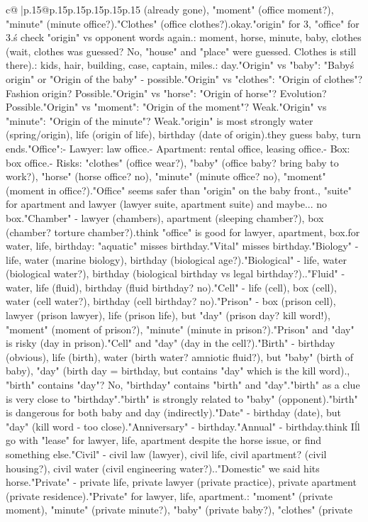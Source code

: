 \documentclass{article}
\begin{document}
{\begin{supertabular}{c@{$\;$}|p{.15\linewidth}@{}p{.15\linewidth}p{.15\linewidth}p{.15\linewidth}p{.15\linewidth}p{.15\linewidth}}
{{{(already gone), "moment" (office moment?), "minute" (minute office?).\n"Clothes" (office clothes?).\nSeems okay.\n\nSo "origin" for 3, "office" for 3.\n\nLet\'s check "origin" vs opponent words again.\nOpponent: moment, horse, minute, baby, clothes (wait, clothes was guessed? No, "house" and "place" were guessed. Clothes is still there).\nDistractor: kids, hair, building, case, captain, miles.\nKill: day.\n\n"Origin" vs "baby": "Baby\'s origin" or "Origin of the baby" - possible.\n"Origin" vs "clothes": "Origin of clothes"? Fashion origin? Possible.\n"Origin" vs "horse": "Origin of horse"? Evolution? Possible.\n"Origin" vs "moment": "Origin of the moment"? Weak.\n"Origin" vs "minute": "Origin of the minute"? Weak.\n\nBut "origin" is most strongly water (spring/origin), life (origin of life), birthday (date of origin).\n\nIf they guess baby, turn ends.\n\n"Office":\n- Lawyer: law office.\n- Apartment: rental office, leasing office.\n- Box: box office.\n- Risks: "clothes" (office wear?), "baby" (office baby? bring baby to work?), "horse" (horse office? no), "minute" (minute office? no), "moment" (moment in office?).\n\n"Office" seems safer than "origin" on the baby front.\n\nActually, "suite" for apartment and lawyer (lawyer suite, apartment suite) and maybe... no box.\n\n"Chamber" - lawyer (chambers), apartment (sleeping chamber?), box (chamber? torture chamber?).\n\nI think "office" is good for lawyer, apartment, box.\n\nAnd for water, life, birthday: "aquatic" misses birthday.\n"Vital" misses birthday.\n"Biology" - life, water (marine biology), birthday (biological age?).\n"Biological" - life, water (biological water?), birthday (biological birthday vs legal birthday?).\nWeak.\n\n"Fluid" - water, life (fluid), birthday (fluid birthday? no).\n\n"Cell" - life (cell), box (cell), water (cell water?), birthday (cell birthday? no).\n\n"Prison" - box (prison cell), lawyer (prison lawyer), life (prison life), but "day" (prison day? kill word!), "moment" (moment of prison?), "minute" (minute in prison?).\n"Prison" and "day" is risky (day in prison).\n\n"Cell" and "day" (day in the cell?).\n\n"Birth" - birthday (obvious), life (birth), water (birth water? amniotic fluid?), but "baby" (birth of baby), "day" (birth day = birthday, but contains "day" which is the kill word).\nActually, "birth" contains "day"? No, "birthday" contains "birth" and "day".\nBut "birth" as a clue is very close to "birthday".\nAnd "birth" is strongly related to "baby" (opponent).\nSo "birth" is dangerous for both baby and day (indirectly).\n\n"Date" - birthday (date), but "day" (kill word - too close).\n"Anniversary" - birthday.\n"Annual" - birthday.\n\nI think I\'ll go with "lease" for lawyer, life, apartment despite the horse issue, or find something else.\n\n"Civil" - civil law (lawyer), civil life, civil apartment? (civil housing?), civil water (civil engineering water?).\nWeak.\n\n"Domestic" we said hits horse.\n\n"Private" - private life, private lawyer (private practice), private apartment (private residence).\n"Private" for lawyer, life, apartment.\nRisks: "moment" (private moment), "minute" (private minute?), "baby" (private baby?), "clothes" (private }}}
\end{supertabular}}
\end{document}
